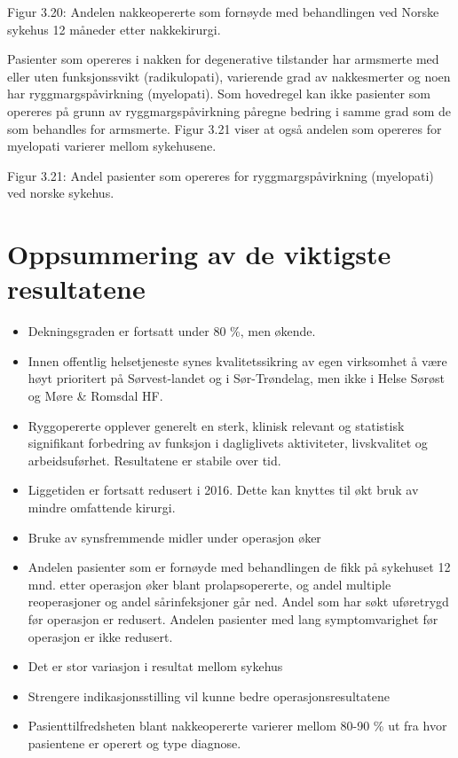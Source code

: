 \documentclass [norsk,a4paper,twoside]{article}\usepackage[]{graphicx}\usepackage[]{color}
\begin{document}
Figur 3.20: Andelen nakkeopererte som fornøyde med behandlingen ved Norske
sykehus 12 måneder etter nakkekirurgi.

Pasienter som opereres i nakken for degenerative tilstander har armsmerte med
eller uten funksjonssvikt (radikulopati), varierende grad av nakkesmerter og noen
har ryggmargspåvirkning (myelopati). Som hovedregel kan ikke pasienter som
opereres på grunn av ryggmargspåvirkning påregne bedring i samme grad som de
som behandles for armsmerte. Figur 3.21 viser at også andelen som opereres for
myelopati varierer mellom sykehusene.

Figur 3.21: Andel pasienter som opereres for ryggmargspåvirkning (myelopati) ved
norske sykehus.

\section{Oppsummering av de viktigste resultatene}

\begin{itemize}
\item Dekningsgraden er fortsatt under 80 \%, men økende.
\item Innen offentlig helsetjeneste synes kvalitetssikring av egen virksomhet å
være høyt prioritert på Sørvest-landet og i Sør-Trøndelag, men ikke i Helse
Sørøst og Møre & Romsdal HF.
\item Ryggopererte opplever generelt en sterk, klinisk relevant og statistisk
signifikant forbedring av funksjon i dagliglivets aktiviteter, livskvalitet og
arbeidsuførhet. Resultatene er stabile over tid.
\item Liggetiden er fortsatt redusert i 2016. Dette kan knyttes til økt bruk av
mindre omfattende kirurgi.
\item Bruke av synsfremmende midler under operasjon øker
\item Andelen pasienter som er fornøyde med behandlingen de fikk på sykehuset
12 mnd. etter operasjon øker blant prolapsopererte, og andel multiple
reoperasjoner og andel sårinfeksjoner går ned. Andel som har søkt
uføretrygd før operasjon er redusert. Andelen pasienter med lang
symptomvarighet før operasjon er ikke redusert.
\item Det er stor variasjon i resultat mellom sykehus
\item Strengere indikasjonsstilling vil kunne bedre operasjonsresultatene
\item Pasienttilfredsheten blant nakkeopererte varierer mellom 80-90 \% ut fra
hvor pasientene er operert og type diagnose.
\end{itemize}
\end{document}
